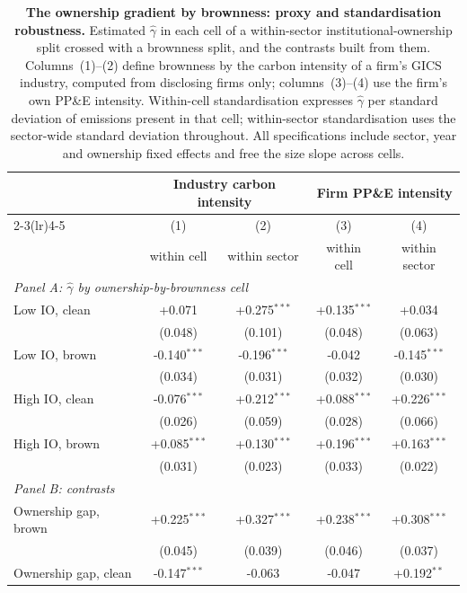 \documentclass[a4paper,12pt]{article}
\begin{document}
\begin{table}[htbp]
\footnotesize\centering
\caption{\textbf{The ownership gradient by brownness: proxy and standardisation robustness.}
Estimated $\hat\gamma$ in each cell of a within-sector institutional-ownership split crossed with a
brownness split, and the contrasts built from them. Columns~(1)--(2) define brownness by the carbon
intensity of a firm's GICS industry, computed from disclosing firms only; columns~(3)--(4) use the
firm's own PP\&E intensity. Within-cell standardisation expresses $\hat\gamma$ per standard deviation
of emissions present in that cell; within-sector standardisation uses the sector-wide standard
deviation throughout. All specifications include sector, year and ownership fixed effects and free
the size slope across cells.}
\label{tab:gamma_brown_robustness}
\begin{tabular}{lcccc}
\toprule
 & \multicolumn{2}{c}{Industry carbon intensity} & \multicolumn{2}{c}{Firm PP\&E intensity} \\
\cmidrule(lr){2-3}\cmidrule(lr){4-5}
 & (1) & (2) & (3) & (4) \\
 & within cell & within sector & within cell & within sector \\
\midrule
\multicolumn{5}{l}{\emph{Panel A: $\hat\gamma$ by ownership-by-brownness cell}} \\[2pt]
Low IO, clean & +0.071 & +0.275$^{***}$ & +0.135$^{***}$ & +0.034 \\
 & (0.048) & (0.101) & (0.048) & (0.063) \\
Low IO, brown & -0.140$^{***}$ & -0.196$^{***}$ & -0.042 & -0.145$^{***}$ \\
 & (0.034) & (0.031) & (0.032) & (0.030) \\
High IO, clean & -0.076$^{***}$ & +0.212$^{***}$ & +0.088$^{***}$ & +0.226$^{***}$ \\
 & (0.026) & (0.059) & (0.028) & (0.066) \\
High IO, brown & +0.085$^{***}$ & +0.130$^{***}$ & +0.196$^{***}$ & +0.163$^{***}$ \\
 & (0.031) & (0.023) & (0.033) & (0.022) \\
\midrule
\multicolumn{5}{l}{\emph{Panel B: contrasts}} \\[2pt]
Ownership gap, brown & +0.225$^{***}$ & +0.327$^{***}$ & +0.238$^{***}$ & +0.308$^{***}$ \\
 & (0.045) & (0.039) & (0.046) & (0.037) \\
Ownership gap, clean & -0.147$^{***}$ & -0.063 & -0.047 & +0.192$^{**}$ \\

\end{tabular}
\end{table}
\end{document}
